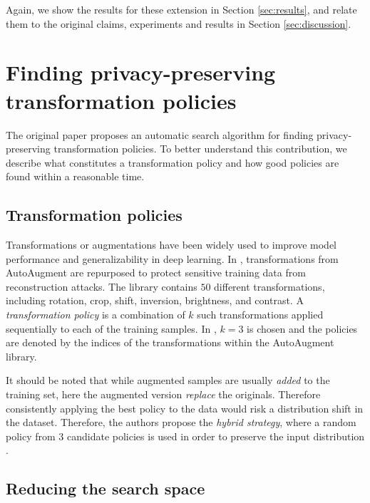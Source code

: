 Again, we show the results for these extension in Section \ref{sec:results}, and relate them to the original claims, experiments and results in Section \ref{sec:discussion}.


\section{Finding privacy-preserving transformation policies}

The original paper proposes an automatic search algorithm for finding privacy-preserving transformation policies. To better understand this contribution, we describe what constitutes a transformation policy and how good policies are found within a reasonable time.

\subsection{Transformation policies}

Transformations or augmentations have been widely used to improve model performance and generalizability in deep learning. In \cite{gao2021privacy}, transformations from AutoAugment \cite{cubuk2019autoaugment} are repurposed to protect sensitive training data from reconstruction attacks. The library contains $50$ different transformations, including rotation, crop, shift, inversion, brightness, and contrast. A \emph{transformation policy} is a combination of $k$ such transformations applied sequentially to each of the training samples. In \cite{gao2021privacy}, $k=3$ is chosen and the policies are denoted by the indices of the transformations within the AutoAugment library.

It should be noted that while augmented samples are usually \emph{added} to the training set, here the augmented version \emph{replace} the originals. Therefore consistently applying the best policy to the data would risk a distribution shift in the dataset. Therefore, the authors propose the \emph{hybrid strategy}, where a random policy from $3$ candidate policies is used in order to preserve the input distribution \cite{gao2021privacy}.

\subsection{Reducing the search space}
\label{sec:3.2search}

